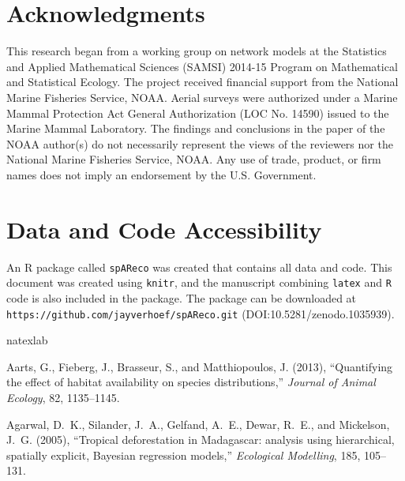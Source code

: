 \documentclass[11pt, titlepage]{article}\usepackage[]{graphicx}\usepackage[]{color}
\begin{document}
\begin{spacing}{1.9}
\begin{flushleft}
\section*{Acknowledgments} 

This research began from a working group on network models at the Statistics and Applied Mathematical Sciences (SAMSI) 2014-15 Program on Mathematical and Statistical Ecology. The project received financial support from the National Marine Fisheries Service, NOAA. Aerial surveys were authorized under a Marine Mammal Protection Act General Authorization (LOC No. 14590) issued to the Marine Mammal Laboratory. The findings and conclusions in the paper of the NOAA author(s) do not necessarily represent the views of the reviewers nor the National Marine Fisheries Service, NOAA. Any use of trade, product, or firm names does not imply an endorsement by the U.S. Government. 

\section*{Data and Code Accessibility}

An R package called \texttt{spAReco} was created that contains all data and code. This document was created using \texttt{knitr}, and the manuscript combining \texttt{latex} and \texttt{R} code is also included in the package.  The package can be downloaded at \texttt{https://github.com/jayverhoef/spAReco.git} (DOI:10.5281/zenodo.1035939).


\begin{thebibliography}{126}
\newcommand{\enquote}[1]{``#1''}
\expandafter\ifx\csname natexlab\endcsname\relax\def\natexlab#1{#1}\fi

Aarts, G., Fieberg, J., Brasseur, S., and Matthiopoulos, J. (2013),
  \enquote{Quantifying the effect of habitat availability on species
  distributions,} \textit{Journal of Animal Ecology}, 82, 1135--1145.

Agarwal, D.~K., Silander, J.~A., Gelfand, A.~E., Dewar, R.~E., and Mickelson,
  J.~G. (2005), \enquote{Tropical deforestation in Madagascar: analysis using
  hierarchical, spatially explicit, Bayesian regression models,}
  \textit{Ecological Modelling}, 185, 105--131.


\end{thebibliography}
\end{flushleft}
\end{spacing}
\end{document}
